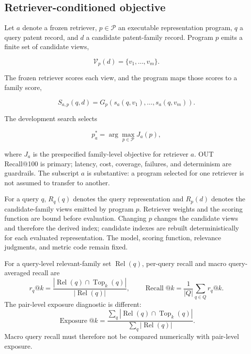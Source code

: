 \documentclass[final,5p,times,twocolumn]{elsarticle}
\begin{document}
\subsection{Retriever-conditioned objective}

Let \(a\) denote a frozen retriever, \(p\in\mathcal{P}\) an executable
representation program, \(q\) a query patent record, and \(d\) a candidate
patent-family record. Program \(p\) emits a finite set of candidate views,

\begin{equation}
 \mathcal{V}_{p}(d)=\{v_1,\ldots,v_m\}.
\end{equation}

The frozen retriever scores each view, and the program maps those scores to a
family score,

\begin{equation}
 S_{a,p}(q,d)=G_p\!\left(s_a(q,v_1),\ldots,s_a(q,v_m)\right).
\end{equation}

The development search selects

\begin{equation}
 p_a^{*}=\arg\max_{p\in\mathcal{P}}J_a(p),
\end{equation}

where \(J_a\) is the prespecified family-level objective for retriever \(a\). OUT
Recall@100 is primary; latency, cost, coverage, failures, and determinism are
guardrails. The subscript \(a\) is substantive: a program selected for one
retriever is not assumed to transfer to another.

For a query \(q\), \(R_q(q)\) denotes the query representation and \(R_p(d)\)
denotes the candidate-family views emitted by program \(p\). Retriever weights
and the scoring function are bound before evaluation. Changing \(p\) changes
the candidate views and therefore the derived index; candidate indexes are
rebuilt deterministically for each evaluated representation. The model,
scoring function, relevance judgments, and metric code remain fixed.

For a query-level relevant-family set \(\operatorname{Rel}(q)\), per-query
recall and macro query-averaged recall are
\begin{equation}
 r_q@k=\frac{|\operatorname{Rel}(q)\cap\operatorname{Top}_k(q)|}
 {|\operatorname{Rel}(q)|},\qquad
 \operatorname{Recall}@k=\frac{1}{|Q|}\sum_{q\in Q}r_q@k .
\end{equation}
The pair-level exposure diagnostic is different:
\begin{equation}
 \operatorname{Exposure}@k=\frac{\sum_q|\operatorname{Rel}(q)\cap
 \operatorname{Top}_k(q)|}{\sum_q|\operatorname{Rel}(q)|}.
\end{equation}
Macro query recall must therefore not be compared numerically with pair-level
exposure.
\end{document}
